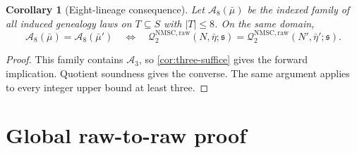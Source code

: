 \documentclass[11pt]{article}
\newtheorem{corollary}[theorem]{Corollary}
\newcommand{\Qraw}{\mathcal Q^{\mathrm{NMSC,raw}}_2}
\begin{document}
\begin{corollary}[Eight-lineage consequence]
\label{thm:eight}
Let $\mathcal A_8(\bar\mu)$ be the indexed family of all induced genealogy
laws on $T\subseteq S$ with $|T|\le8$. On the same domain,
\[
 \mathcal A_8(\bar\mu)=\mathcal A_8(\bar\mu')
 \quad\Longleftrightarrow\quad
 \Qraw(N,\bar\eta;\mathfrak s)=\Qraw(N',\bar\eta';\mathfrak s).
\]
\end{corollary}
\begin{proof}
This family contains $\mathcal A_3$, so \cref{cor:three-suffice} gives the
forward implication. Quotient soundness gives the converse. The same
argument applies to every integer upper bound at least three.
\end{proof}

\section{Global raw-to-raw proof}
\label{sec:global}
\end{document}
